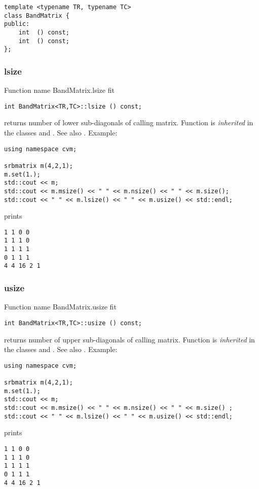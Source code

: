 \bigskip
\noindent%
\verb"template <typename TR, typename TC>"\\
\verb"class BandMatrix {"\\
\verb"public:"\\
\verb"    int "\verb" () const;"\\
\verb"    int "\verb" () const;"\\
\verb"};"
\newpage


\subsubsection{lsize}
Function%
\pdfdest name {BandMatrix.lsize} fit
\begin{verbatim}
int BandMatrix<TR,TC>::lsize () const;
\end{verbatim}
returns number of lower sub-diagonals
of calling matrix.
Function is \emph{inherited} in the classes
 and .
See also .
Example:
\begin{Verbatim}
using namespace cvm;

srbmatrix m(4,2,1);
m.set(1.);
std::cout << m;
std::cout << m.msize() << " " << m.nsize() << " " << m.size();
std::cout << " " << m.lsize() << " " << m.usize() << std::endl;
\end{Verbatim}
prints
\begin{Verbatim}
1 1 0 0
1 1 1 0
1 1 1 1
0 1 1 1
4 4 16 2 1
\end{Verbatim}
\newpage


\subsubsection{usize}
Function%
\pdfdest name {BandMatrix.usize} fit
\begin{verbatim}
int BandMatrix<TR,TC>::usize () const;
\end{verbatim}
returns number of upper sub-diagonals
of calling matrix.
Function is \emph{inherited} in the classes
 and .
See also .
Example:
\begin{Verbatim}
using namespace cvm;

srbmatrix m(4,2,1);
m.set(1.);
std::cout << m;
std::cout << m.msize() << " " << m.nsize() << " " << m.size() ;
std::cout << " " << m.lsize() << " " << m.usize() << std::endl;
\end{Verbatim}
prints
\begin{Verbatim}
1 1 0 0
1 1 1 0
1 1 1 1
0 1 1 1
4 4 16 2 1
\end{Verbatim}
\newpage


